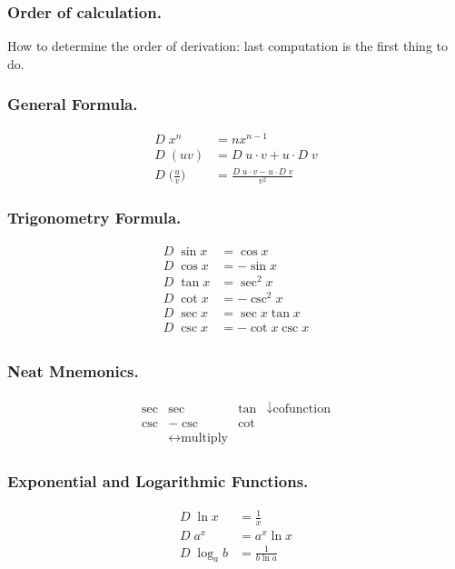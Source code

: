 \documentclass[../../../main.tex]{subfiles}
\begin{document}
\subsubsection{Order of calculation.} How to determine the order of derivation: last computation is the first thing to do.

\subsubsection{General Formula.}
\begin{align*}
     D\; x^n&=nx^{n-1}\\
     D\; (uv)&= D\;u\cdot v+u\cdot D\;v\\
     D\;\bigg(\frac{u}{v}\bigg)&=\frac{ D\;u\cdot v-u\cdot D\;v}{v^2}
\end{align*}

\subsubsection{Trigonometry Formula.}
\begin{align*}
     D\; \sin x&= \cos x\\
     D\; \cos x&= -\sin x\\
     D\; \tan x&= \sec^2 x\\
     D\; \cot x&= -\csc^2 x\\
     D\; \sec x&= \sec x\tan x\\
     D\; \csc x&= -\cot x\csc x\\
\end{align*}

\subsubsection{Neat Mnemonics.}
\begin{align*}
\begin{matrix}
    \sec&\sec&\tan&\downarrow \textrm{cofunction}\\
    \csc&-\csc&\cot&\\
    &\leftrightarrow\textrm{multiply}
\end{matrix}
\end{align*}

\subsubsection{Exponential and Logarithmic Functions.}
\begin{align*}
     D\; \ln x &= \frac{1}{x}\\
     D\; a^x&=a^x\ln x\\
     D\; \log_a b&=\frac{1}{b\ln a}
\end{align*}
\end{document}
